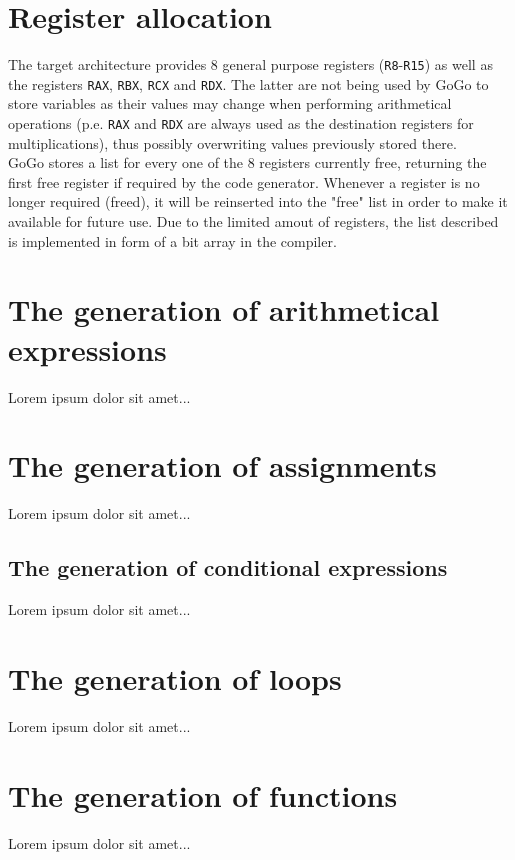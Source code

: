 \documentclass[a4paper]{scrreprt}
\begin{document}
    \section{Register allocation}
        The target architecture provides 8 general purpose registers (\texttt{R8}-\texttt{R15}) as well as the registers \texttt{RAX}, \texttt{RBX}, \texttt{RCX} and \texttt{RDX}\cite{int09}. The latter are not being used by GoGo to store variables as their values may change when performing arithmetical operations (p.e. \texttt{RAX} and \texttt{RDX} are always used as the destination registers for multiplications), thus possibly overwriting values previously stored there.\\
        GoGo stores a list for every one of the 8 registers currently free, returning the first free register if required by the code generator. Whenever a register is no longer required (freed), it will be reinserted into the "free" list in order to make it available for future use. Due to the limited amout of registers, the list described is implemented in form of a bit array in the compiler.

    \section{The generation of arithmetical expressions}
      Lorem ipsum dolor sit amet...

    \section{The generation of assignments}
      Lorem ipsum dolor sit amet...

    \subsection{The generation of conditional expressions}
      Lorem ipsum dolor sit amet...

    \section{The generation of loops}
      Lorem ipsum dolor sit amet...

    \section{The generation of functions}
      Lorem ipsum dolor sit amet...
\end{document}
